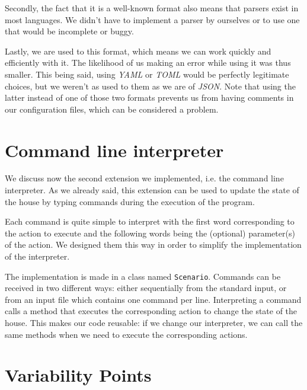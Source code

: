 		Secondly, the fact that it is a well-known format also means that parsers exist in most languages. We didn't have to implement a parser by ourselves or to use one that would be incomplete or buggy.

		Lastly, we are used to this format, which means we can work quickly and efficiently with it. The likelihood of us making an error while using it was thus smaller. This being said, using \textit{YAML} or \textit{TOML} would be perfectly legitimate choices, but we weren't as used to them as we are of \textit{JSON}. Note that using the latter instead of one of those two formats prevents us from having comments in our configuration files, which can be considered a problem.

	\section{Command line interpreter}
		We discuss now the second extension we implemented, i.e. the command line interpreter. As we already said, this extension can be used to update the state of the house by typing commands during the execution of the program.

		Each command is quite simple to interpret with the first word corresponding to the action to execute and the following words being the (optional) parameter(s) of the action. We designed them this way in order to simplify the implementation of the interpreter.

		The implementation is made in a class named \texttt{Scenario}. Commands can be received in two different ways: either sequentially from the standard input, or from an input file which contains one command per line. Interpreting a command calls a method that executes the corresponding action to change the state of the house. This makes our code reusable: if we change our interpreter, we can call the same methods when we need to execute the corresponding actions.

  \section{Variability Points}
